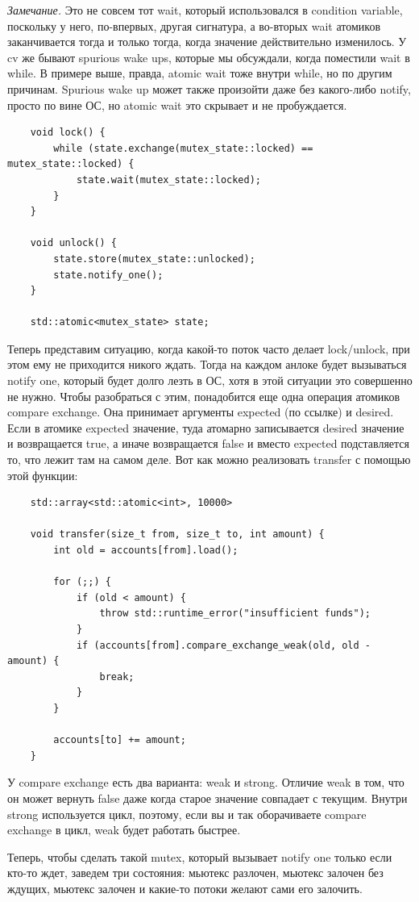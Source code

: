 \documentclass[12pt, a4paper]{article}
\begin{document}
\textit{Замечание.} Это не совсем тот wait, который использовался в condition variable, поскольку у него, по-впервых, другая сигнатура, а во-вторых wait атомиков заканчивается тогда и только тогда, когда значение действительно изменилось. У cv же бывают spurious wake ups, которые мы обсуждали, когда поместили wait в while. В примере выше, правда, atomic wait тоже внутри while, но по другим причинам. Spurious wake up может также произойти даже без какого-либо notify, просто по вине ОС, но atomic wait это скрывает и не пробуждается.
\begin{verbatim}
	void lock() {
		while (state.exchange(mutex_state::locked) == mutex_state::locked) {
			state.wait(mutex_state::locked);
		}
	}
	
	void unlock() {
		state.store(mutex_state::unlocked);
		state.notify_one();
	}
	
	std::atomic<mutex_state> state;
\end{verbatim}
Теперь представим ситуацию, когда какой-то поток часто делает lock/unlock, при этом ему не приходится никого ждать. Тогда на каждом анлоке будет вызываться notify one, который будет долго лезть в ОС, хотя в этой ситуации это совершенно не нужно. Чтобы разобраться с этим, понадобится еще одна операция атомиков compare exchange. Она принимает аргументы expected (по ссылке) и desired. Если в атомике expected значение, туда атомарно записывается desired значение и возвращается true, а иначе возвращается false и вместо expected подставляется то, что лежит там на самом деле. Вот как можно реализовать transfer с помощью этой функции:
\begin{verbatim}
	std::array<std::atomic<int>, 10000>
	
	void transfer(size_t from, size_t to, int amount) {
		int old = accounts[from].load();
		
		for (;;) {
			if (old < amount) {
				throw std::runtime_error("insufficient funds");
			}
			if (accounts[from].compare_exchange_weak(old, old - amount) {
				break;
			}
		}
		
		accounts[to] += amount;
	}
\end{verbatim}
У compare exchange есть два варианта: weak и strong. Отличие weak в том, что он может вернуть false даже когда старое значение совпадает с текущим. Внутри strong используется цикл, поэтому, если вы и так оборачиваете compare exchange в цикл, weak будет работать быстрее.
\par Теперь, чтобы сделать такой mutex, который вызывает notify one только если кто-то ждет, заведем три состояния: мьютекс разлочен, мьютекс залочен без ждущих, мьютекс залочен и какие-то потоки желают сами его залочить. 
\end{document}
